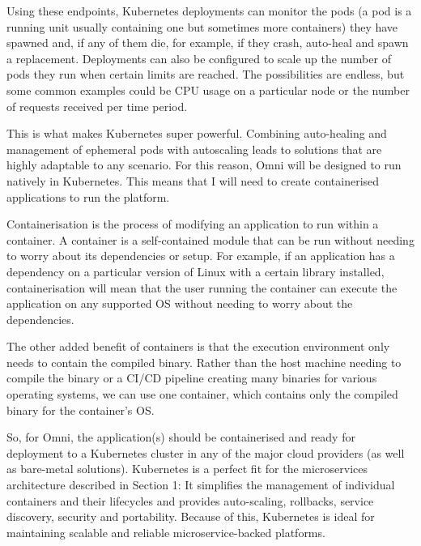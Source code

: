 Using these endpoints, Kubernetes deployments can monitor the pods (a pod is a running unit usually containing one but sometimes more containers) they have spawned and, if any of them die, for example, if they crash, auto-heal and spawn a replacement.
Deployments can also be configured to scale up the number of pods they run when certain limits are reached. The possibilities are endless, but some common examples could be CPU usage on a particular node or the number of requests received per time period.

This is what makes Kubernetes super powerful. Combining auto-healing and management of ephemeral pods with autoscaling leads to solutions that are highly adaptable to any scenario.
For this reason, Omni will be designed to run natively in Kubernetes. This means that I will need to create containerised applications to run the platform.

Containerisation is the process of modifying an application to run within a container. A container is a self-contained module that can be run without needing to worry about its dependencies or setup. For example, if an application has a dependency on a particular version of Linux with a certain library installed, containerisation will mean that the user running the container can execute the application on any supported OS without needing to worry about the dependencies.

The other added benefit of containers is that the execution environment only needs to contain the compiled binary. Rather than the host machine needing to compile the binary or a CI/CD pipeline creating many binaries for various operating systems, we can use one container, which contains only the compiled binary for the container's OS.

So, for Omni, the application(s) should be containerised and ready for deployment to a Kubernetes cluster in any of the major cloud providers (as well as bare-metal solutions).
Kubernetes is a perfect fit for the microservices architecture described in Section 1: It simplifies the management of individual containers and their lifecycles and provides auto-scaling, rollbacks, service discovery, security and portability. Because of this, Kubernetes is ideal for maintaining scalable and reliable microservice-backed platforms.

